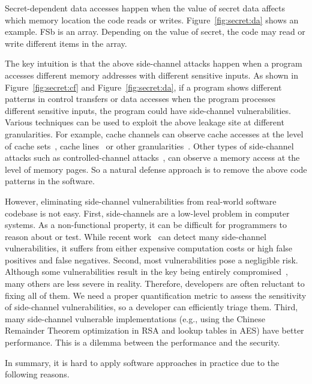 Secret-dependent data accesses happen when the value of secret data affects which memory location the code reads or writes. Figure~\ref{fig:secret:da} shows an example. \textsf{FSb} is an array. Depending on the value of \textsf{secret}, the code may read or write different items in the array.

The key intuition is that the above side-channel attacks happen when a program accesses different memory addresses with different sensitive inputs. As shown in Figure~\ref{fig:secret:cf} and Figure~\ref{fig:secret:da}, if a program shows different patterns in control transfers or data accesses when the program processes different sensitive inputs, the program could have side-channel vulnerabilities. Various techniques can be used to exploit the above leakage site at different granularities. For example, cache channels can observe cache accesses at the level of cache sets~\cite{liu2015last}, cache lines~\cite{184415} or other granularities~\cite{yarom2017cachebleed}. Other types of side-channel attacks such as controlled-channel attacks~\cite{7163052}, can observe a memory access at the level of memory pages. So a natural defense approach is to remove the above code patterns in the software.


However, eliminating side-channel vulnerabilities from real-world software codebase is not easy. First, side-channels are a low-level problem in computer systems. As a non-functional property, it can be difficult for programmers to reason about or test.  While recent work~\cite{203878,217537,Wichelmann:2018:MFF:3274694.3274741,Brotzman19Casym,236338,182946} can detect many side-channel vulnerabilities, it suffers from either expensive computation costs or high false positives and false negatives.  Second, most vulnerabilities pose a negligible risk. Although some vulnerabilities result in the key being entirely compromised~\cite{184415, aumuller2002fault}, many others are less severe in reality. Therefore, developers are often reluctant to fixing all of them. We need a proper quantification metric to assess the sensitivity of side-channel vulnerabilities, so a developer can efficiently triage them.  Third, many side-channel vulnerable implementations (e.g., using the Chinese Remainder Theorem optimization in RSA and lookup tables in AES) have better performance. This is a dilemma between the performance and the security.


In summary, it is hard to apply software approaches in practice due to the following reasons.

